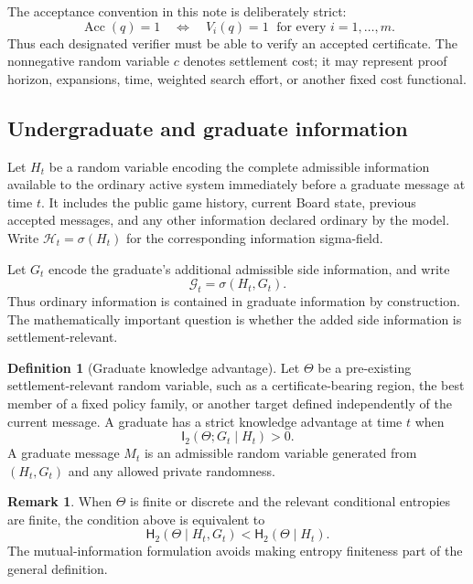 \documentclass[11pt]{article}
\theoremstyle{definition}
\newtheorem{definition}[theorem]{Definition}
\newtheorem{remark}[theorem]{Remark}
\newcommand{\I}{\mathsf{I}}
\newcommand{\Hh}{\mathsf{H}}
\newcommand{\Acc}{\operatorname{Acc}}
\begin{document}
The acceptance convention in this note is deliberately strict:
\begin{equation}
\Acc(q)=1
\quad\Longleftrightarrow\quad
V_i(q)=1\;\text{ for every }i=1,\ldots,m.
\label{eq:all-verifiers}
\end{equation}
Thus each designated verifier must be able to verify an accepted certificate.  The nonnegative random variable $c$ denotes settlement cost; it may represent proof horizon, expansions, time, weighted search effort, or another fixed cost functional.

\subsection{Undergraduate and graduate information}

Let $H_t$ be a random variable encoding the complete admissible information available to the ordinary active system immediately before a graduate message at time $t$.  It includes the public game history, current Board state, previous accepted messages, and any other information declared ordinary by the model.  Write $\mathscr H_t=\sigma(H_t)$ for the corresponding information sigma-field.

Let $G_t$ encode the graduate's additional admissible side information, and write
\[
\mathscr G_t=\sigma(H_t,G_t).
\]
Thus ordinary information is contained in graduate information by construction.  The mathematically important question is whether the added side information is settlement-relevant.

\begin{definition}[Graduate knowledge advantage]
Let $\Theta$ be a pre-existing settlement-relevant random variable, such as a certificate-bearing region, the best member of a fixed policy family, or another target defined independently of the current message.  A graduate has a strict knowledge advantage at time $t$ when
\[
\I_2(\Theta;G_t\mid H_t)>0.
\]
A graduate message $M_t$ is an admissible random variable generated from $(H_t,G_t)$ and any allowed private randomness.
\end{definition}

\begin{remark}
When $\Theta$ is finite or discrete and the relevant conditional entropies are finite, the condition above is equivalent to
\[
\Hh_2(\Theta\mid H_t,G_t)<\Hh_2(\Theta\mid H_t).
\]
The mutual-information formulation avoids making entropy finiteness part of the general definition.
\end{remark}
\end{document}
